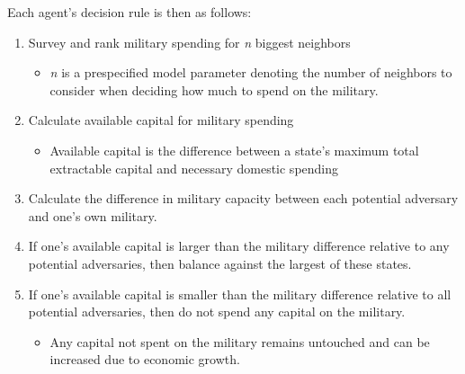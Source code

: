\documentclass[12pt]{article}
\begin{document}
\noindent Each agent's decision rule is then as follows:

\singlespacing

\begin{enumerate}
    \item Survey and rank military spending for \emph{n} biggest neighbors
    \begin{itemize}
        \item \emph{n} is a prespecified model parameter denoting the number of neighbors to consider when deciding how much to spend on the military.
    \end{itemize}
    \item Calculate available capital for military spending
    \begin{itemize}
        \item Available capital is the difference between a state's maximum total extractable capital and necessary domestic spending
    \end{itemize}
    \item Calculate the difference in military capacity between each potential adversary and one's own military.
    \item If one's available capital is larger than the military difference relative to any potential adversaries, then balance against the largest of these states.
    \item If one's available capital is smaller than the military difference relative to all potential adversaries, then do not spend any capital on the military. 
    \begin{itemize}
        \item Any capital not spent on the military remains untouched and can be increased due to economic growth.
    \end{itemize}
\end{enumerate}
\end{document}
